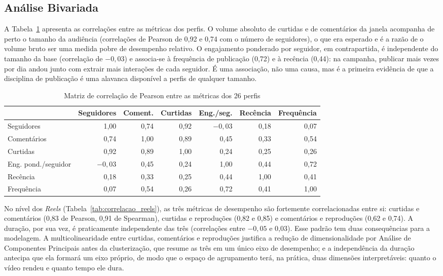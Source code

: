 \subsection{Análise Bivariada}

A Tabela~\ref{tab:correlacao_perfis} apresenta as correlações entre as métricas dos perfis. O volume absoluto de curtidas e de comentários da janela acompanha de perto o tamanho da audiência (correlações de Pearson de 0,92 e 0,74 com o número de seguidores), o que era esperado e é a razão de o volume bruto ser uma medida pobre de desempenho relativo. O engajamento ponderado por seguidor, em contrapartida, é independente do tamanho da base (correlação de $-0{,}03$) e associa-se à frequência de publicação (0,72) e à recência (0,44): na campanha, publicar mais vezes por dia andou junto com extrair mais interações de cada seguidor. É uma associação, não uma causa, mas é a primeira evidência de que a disciplina de publicação é uma alavanca disponível a perfis de qualquer tamanho.

\begin{table}[htb]
\centering
\caption{Matriz de correlação de Pearson entre as métricas dos 26 perfis}
\label{tab:correlacao_perfis}
\footnotesize\setlength{\tabcolsep}{3pt}
\setlength{\tabcolsep}{4pt}
\begin{tabular}{lrrrrrr}
\toprule
 & \textbf{Seguidores} & \textbf{Coment.} & \textbf{Curtidas} & \textbf{Eng./seg.} & \textbf{Recência} & \textbf{Frequência} \\
\midrule
Seguidores & 1,00 & 0,74 & 0,92 & $-0{,}03$ & 0,18 & 0,07 \\
Comentários & 0,74 & 1,00 & 0,89 & 0,45 & 0,33 & 0,54 \\
Curtidas & 0,92 & 0,89 & 1,00 & 0,24 & 0,25 & 0,26 \\
Eng. pond./seguidor & $-0{,}03$ & 0,45 & 0,24 & 1,00 & 0,44 & 0,72 \\
Recência & 0,18 & 0,33 & 0,25 & 0,44 & 1,00 & 0,41 \\
Frequência & 0,07 & 0,54 & 0,26 & 0,72 & 0,41 & 1,00 \\
\bottomrule
\end{tabular}
\end{table}

No nível dos \emph{Reels} (Tabela~\ref{tab:correlacao_reels}), as três métricas de desempenho são fortemente correlacionadas entre si: curtidas e comentários (0,83 de Pearson, 0,91 de Spearman), curtidas e reproduções (0,82 e 0,85) e comentários e reproduções (0,62 e 0,74). A duração, por sua vez, é praticamente independente das três (correlações entre $-0{,}05$ e 0,03). Esse padrão tem duas consequências para a modelagem. A multicolinearidade entre curtidas, comentários e reproduções justifica a redução de dimensionalidade por Análise de Componentes Principais \cite{jolliffe2002} antes da clusterização, que resume as três em um único eixo de desempenho; e a independência da duração antecipa que ela formará um eixo próprio, de modo que o espaço de agrupamento terá, na prática, duas dimensões interpretáveis: quanto o vídeo rendeu e quanto tempo ele dura.

